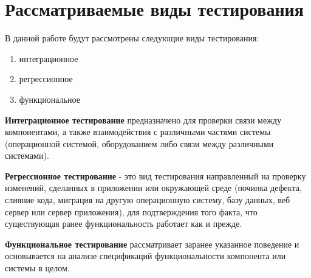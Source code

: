 \section{Рассматриваемые виды тестирования}

В данной работе будут рассмотрены следующие виды тестирования:
\begin{enumerate}
	\item интеграционное
	\item регрессионное
	\item функциональное
\end{enumerate}


\textbf{Интеграционное тестирование} предназначено для проверки связи между компонентами, а также взаимодействия с различными частями системы (операционной системой, оборудованием либо связи между различными системами).

\textbf{Регрессионное тестирование} - это вид тестирования направленный на проверку изменений, сделанных в приложении или окружающей среде (починка дефекта, слияние кода, миграция на другую операционную систему, базу данных, веб сервер или сервер приложения), для подтверждения того факта, что существующая ранее функциональность работает как и прежде.

\textbf{Функциональное тестирование} рассматривает заранее указанное поведение и основывается на анализе спецификаций функциональности компонента или системы в целом. 
